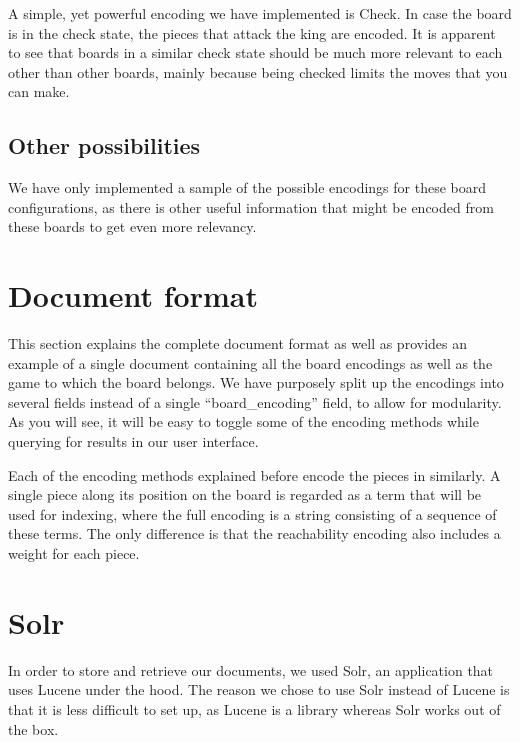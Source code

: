 \documentclass[11pt]{article}
\begin{document}
    A simple, yet powerful encoding we have implemented is Check. In case the board is in the check state, the pieces that attack the king are encoded. It is apparent to see that boards in a similar check state should be much more relevant to each other than other boards, mainly because being checked limits the moves that you can make.

    \subsection{Other possibilities}

    We have only implemented a sample of the possible encodings for these board configurations, as there is other useful information that might be encoded from these boards to get even more relevancy.



    \section{Document format}\label{sec:documentformat}


    This section explains the complete document format as well as provides an example of a single document containing all the board encodings as well as the game to which the board belongs. We have purposely split up the encodings into several fields instead of a single ``board\_encoding'' field, to allow for modularity. As you will see, it will be easy to toggle some of the encoding methods while querying for results in our user interface.

    Each of the encoding methods explained before encode the pieces in similarly. A single piece along its position on the board is regarded as a term that will be used for indexing, where the full encoding is a string consisting of a sequence of these terms. The only difference is that the reachability encoding also includes a weight for each piece.


    \section{Solr}

    In order to store and retrieve our documents, we used Solr, an application that uses Lucene under the hood. The reason we chose to use Solr instead of Lucene is that it is less difficult to set up, as Lucene is a library whereas Solr works out of the box.
\end{document}
